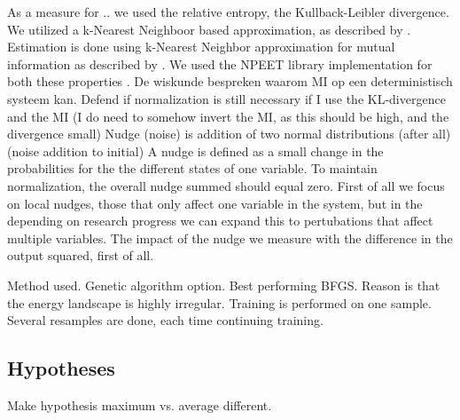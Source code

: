 \documentclass[../main.tex]{subfiles}
\begin{document}


As a measure for .. we used the relative entropy, the Kullback-Leibler divergence.
We utilized a k-Nearest Neighboor based approximation, as described by \citep{wang2009divergence}.
Estimation is done using k-Nearest Neighbor approximation for mutual information as described by \citep{kraskov2004estimating}.
We used the NPEET library implementation for both these properties \cite{versteeg2013NPEET}.
De wiskunde bespreken waarom MI op een deterministisch systeem kan.
Defend if normalization is still necessary if I use the KL-divergence and the MI (I do need to somehow invert the MI, as this should be high, and the divergence small)
Nudge (noise) is addition of two normal distributions (after all) (noise addition to initial)
A nudge is defined as a small change in the probabilities for the the different states of one variable. To maintain normalization, the overall nudge summed should equal zero.
First of all we focus on local nudges, those that only affect one variable in the system, but in the depending on research progress we can expand this to pertubations that affect multiple variables. 
The impact of the nudge we measure with the difference in the output squared, first of all.

Method used.
Genetic algorithm option.
Best performing BFGS.
Reason is that the energy landscape is highly irregular.
Training is performed on one sample.
Several resamples are done, each time continuing training.

\subsection{Hypotheses}

Make hypothesis maximum vs. average different.
\end{document}
